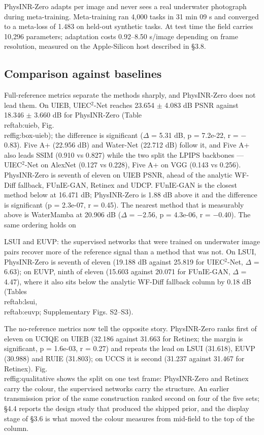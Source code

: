 \documentclass[journal]{IEEEtran}
\begin{document}
PhysINR-Zero adapts per image and never sees a real underwater photograph during meta-training. Meta-training ran 4,000 tasks in 31 min 09 s and converged to a meta-loss of 1.483 on held-out synthetic tasks. At test time the field carries 10,296 parameters; adaptation costs 0.92--8.50 s/image depending on frame resolution, measured on the Apple-Silicon host described in \S{}3.8.

\subsection{Comparison against baselines}
Full-reference metrics separate the methods sharply, and PhysINR-Zero does not lead them. On UIEB, UIEC$^{2}$-Net reaches 23.654 $\pm$ 4.083 dB PSNR against 18.346 $\pm$ 3.660 dB for PhysINR-Zero (Table~\\ref{tab:uieb}, Fig.~\\ref{fig:box-uieb}); the difference is significant ($\Delta$ = 5.31 dB, p = 7.2e-22, r = $-$0.83). Five A+ (22.956 dB) and Water-Net (22.712 dB) follow it, and Five A+ also leads SSIM (0.910 vs 0.827) while the two split the LPIPS backbones --- UIEC$^{2}$-Net on AlexNet (0.127 vs 0.228), Five A+ on VGG (0.143 vs 0.256). PhysINR-Zero is seventh of eleven on UIEB PSNR, ahead of the analytic WF-Diff fallback, FUnIE-GAN, Retinex and UDCP. FUnIE-GAN is the closest method below at 16.471 dB; PhysINR-Zero is 1.88 dB above it and the difference is significant (p = 2.3e-07, r = 0.45). The nearest method that is measurably above is WaterMamba at 20.906 dB ($\Delta$ = $-$2.56, p = 4.3e-06, r = $-$0.40). The same ordering holds on

LSUI and EUVP: the supervised networks that were trained on underwater image
pairs recover more of the reference signal than a method that was not. On
LSUI, PhysINR-Zero is seventh of eleven (19.188 dB against
25.819 for UIEC$^{2}$-Net, $\Delta$ = 6.63); on EUVP, ninth of eleven (15.603 against 20.071 for FUnIE-GAN, $\Delta$ = 4.47), where it also sits below the analytic WF-Diff fallback column by 0.18 dB (Tables~\\ref{tab:lsui},~\\ref{tab:euvp}; Supplementary Figs. S2--S3).

The no-reference metrics now tell the opposite story. PhysINR-Zero ranks first of eleven on UCIQE on UIEB (32.186 against 31.663 for Retinex; the margin is significant, p = 1.6e-03, r = 0.27) and repeats the lead on LSUI (31.618), EUVP (30.988) and RUIE (31.803); on UCCS it is second (31.237 against 31.467 for Retinex). Fig.~\\ref{fig:qualitative} shows the split on one test frame: PhysINR-Zero and Retinex carry the colour, the supervised networks carry the structure. An earlier transmission prior of the same construction ranked second on four of the five sets; \S{}4.4 reports the design study that produced the shipped prior, and the display stage of \S{}3.6 is what moved the colour measures from mid-field to the top of the column.
\end{document}

